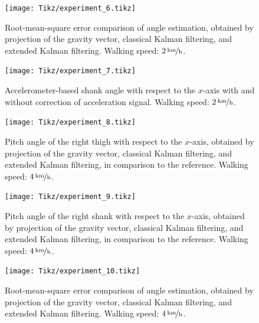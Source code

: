 \begin{figure}
	\centering
	\setlength\figureheight{7cm} 
	\setlength\figurewidth{\textwidth}
	\texttt{[image: Tikz/experiment\_6.tikz]}
	\caption{Root-mean-square error comparison of angle estimation, obtained by projection of the gravity vector, classical Kalman filtering, and extended Kalman filtering. Walking speed: $\unitfrac[2]{km}{h}$.}
	\label{fig:experiment_6}
\end{figure}

\begin{figure}
	\centering
	\setlength\figureheight{7cm} 
	\setlength\figurewidth{\textwidth}
	\texttt{[image: Tikz/experiment\_7.tikz]}
	\caption{Accelerometer-based shank angle with respect to the $x$-axis with and without correction of acceleration signal. Walking speed: $\unitfrac[2]{km}{h}$.}
	\label{fig:experiment_7}
\end{figure}

\begin{figure}
	\centering
	\setlength\figureheight{6.8cm} 
	\setlength\figurewidth{\textwidth}
	\texttt{[image: Tikz/experiment\_8.tikz]}
	\caption{Pitch angle of the right thigh with respect to the $x$-axis, obtained by projection of the gravity vector, classical Kalman filtering, and extended Kalman filtering, in comparison to the reference. Walking speed: $\unitfrac[4]{km}{h}$.}
	\label{fig:experiment_8}
\end{figure}

\begin{figure}
	\centering
	\setlength\figureheight{6.8cm} 
	\setlength\figurewidth{\textwidth}
	\texttt{[image: Tikz/experiment\_9.tikz]}
	\caption{Pitch angle of the right shank with respect to the $x$-axis, obtained by projection of the gravity vector, classical Kalman filtering, and extended Kalman filtering, in comparison to the reference. Walking speed: $\unitfrac[4]{km}{h}$.}
	\label{fig:experiment_9}
\end{figure}

\begin{figure}
	\centering
	\setlength\figureheight{7cm} 
	\setlength\figurewidth{\textwidth}
	\texttt{[image: Tikz/experiment\_10.tikz]}
	\caption{Root-mean-square error comparison of angle estimation, obtained by projection of the gravity vector, classical Kalman filtering, and extended Kalman filtering. Walking speed: $\unitfrac[4]{km}{h}$.}
	\label{fig:experiment_10}
\end{figure}

